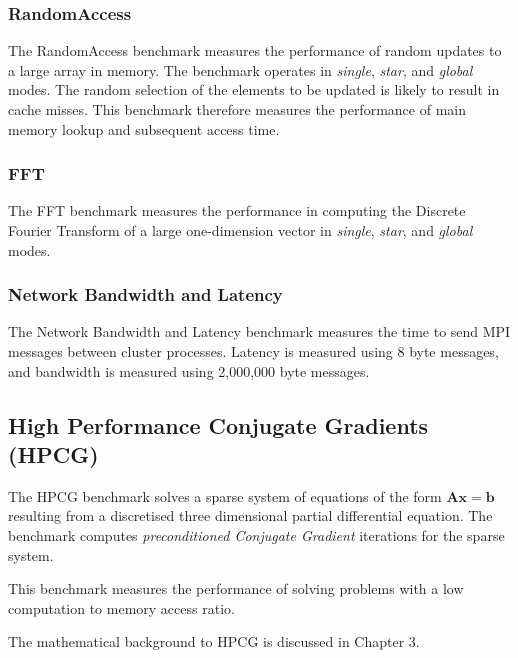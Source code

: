 %
%
\subsubsection{RandomAccess}

The RandomAccess benchmark measures the performance of random updates to a large array in memory. The benchmark operates in \emph{single}, \emph{star}, and \emph{global} modes. The random selection of the elements to be updated is likely to result in cache misses. This benchmark therefore measures the performance of main memory lookup and subsequent access time. 


%
%
\subsubsection{FFT}

The FFT benchmark measures the performance in computing the Discrete Fourier Transform of a large one-dimension vector in \emph{single}, \emph{star}, and \emph{global} modes.


%
%
\subsubsection{Network Bandwidth and Latency}

The Network Bandwidth and Latency benchmark measures the time to send MPI messages between cluster processes. Latency is measured using 8 byte messages, and bandwidth is measured using 2,000,000 byte messages.



%
%
\subsection{High Performance Conjugate Gradients (HPCG)}

The HPCG benchmark solves a sparse system of equations of the form $\mathbf{Ax} = \mathbf{b}$ resulting from a discretised three dimensional partial differential equation. The benchmark computes \emph{preconditioned Conjugate Gradient} iterations for the sparse system.

This benchmark measures the performance of solving problems with a low computation to memory access ratio.

The mathematical background to HPCG is discussed in Chapter 3.






